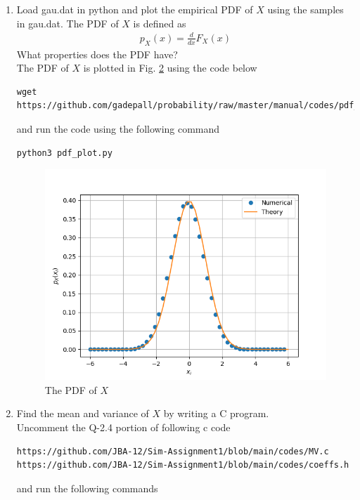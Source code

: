 \documentclass[journal,12pt,twocolumn]{IEEEtran}
\renewcommand\thesection{\arabic{section}}
\begin{document}
\begin{enumerate}[label=\thesection.\arabic*
,ref=\thesection.\theenumi]
\begin{figure}[!htbp]
\caption{The CDF of $X$}
\label{fig:gauss_cdf}
\end{figure}
\item
Load gau.dat in python and plot the empirical PDF of $X$ using the samples in gau.dat. The PDF of $X$ is defined as
\begin{align}
p_{X}(x) = \frac{d}{dx}F_{X}(x)
\end{align}
What properties does the PDF have?
\\
\solution The PDF of $X$ is plotted in Fig. \ref{fig:gauss_pdf} using the code below
\begin{lstlisting}
wget https://github.com/gadepall/probability/raw/master/manual/codes/pdf_plot.py
\end{lstlisting}
and run the code using the following command
\begin{lstlisting}
python3 pdf_plot.py
\end{lstlisting}
\begin{figure}[!htbp]
\centering
\includegraphics[width=\columnwidth]{./figs/gauss_pdf}
\caption{The PDF of $X$}
\label{fig:gauss_pdf}
\end{figure}
\item Find the mean and variance of $X$ by writing a C program.\\
\solution Uncomment the Q-2.4 portion of following c code
\begin{lstlisting}
https://github.com/JBA-12/Sim-Assignment1/blob/main/codes/MV.c
https://github.com/JBA-12/Sim-Assignment1/blob/main/codes/coeffs.h
\end{lstlisting}
and run the following commands 
\begin{lstlisting}

\end{lstlisting}
\end{enumerate}
\end{document}
